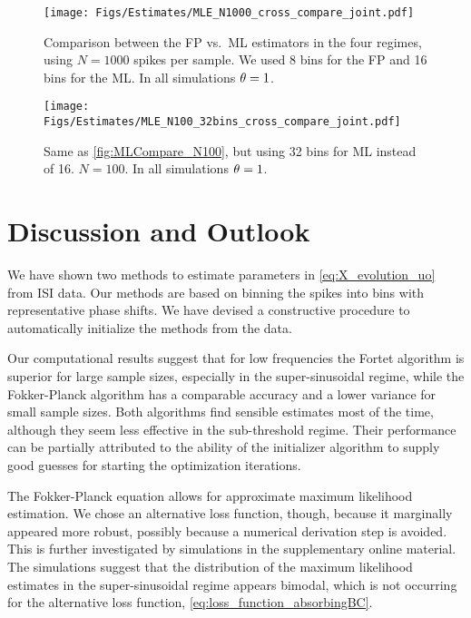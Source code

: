 \begin{figure}[htp]
\begin{center}
  \texttt{[image: Figs/Estimates/MLE\_N1000\_cross\_compare\_joint.pdf]}
  \caption[labelInTOC]{Comparison between the FP vs.\ ML
  estimators in the four regimes, using $N=1000$ spikes per sample. We used 8
  bins for the FP and 16 bins for the ML. In all simulations ${ \theta} = 1$.}
  \label{fig:MLCompare_N1000}
\end{center}
\end{figure} 

\begin{figure}[htp]
\begin{center}
  \texttt{[image: Figs/Estimates/MLE\_N100\_32bins\_cross\_compare\_joint.pdf]}
  \caption{Same as \cref{fig:MLCompare_N100}, but using 32
  bins for ML instead of 16. $N=100$. In all simulations ${ \theta} = 1$.}
  \label{fig:MLCompare_N100_32bins}
\end{center}
\end{figure}



\section{Discussion and Outlook}
\label{sec:sin_estimate_discusion}
We have shown two methods to estimate parameters in
\cref{eq:X_evolution_uo} from ISI data. Our methods are based
on binning the spikes into bins with representative phase shifts. We have
devised a constructive procedure to automatically initialize the methods from
the data.

Our computational results suggest that for low frequencies the Fortet algorithm
is superior for large sample sizes, especially in the super-sinusoidal regime, while the
Fokker-Planck algorithm has a comparable accuracy and a lower variance for small
sample sizes. Both algorithms find sensible estimates most of the time, although
they seem less effective in the sub-threshold regime. Their performance can
be partially attributed to the ability of the initializer algorithm to supply
good guesses for starting the optimization iterations.

The Fokker-Planck equation allows for approximate maximum likelihood
estimation. We chose an alternative loss function, though, because it
marginally appeared more robust, possibly because a numerical derivation
step is avoided. This is further investigated by simulations in the
supplementary online material. The simulations suggest that the
distribution of the maximum likelihood estimates in the super-sinusoidal
regime appears bimodal, which is not occurring for the alternative loss
function, \cref{eq:loss_function_absorbingBC}. %

